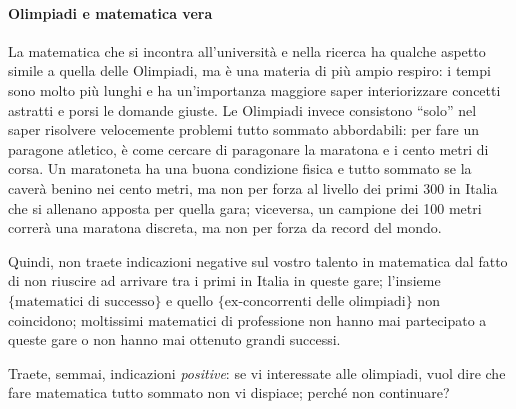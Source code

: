 \documentclass[a4paper,10pt]{paper}
\begin{document}
\paragraph{Olimpiadi e matematica vera}
 La matematica che si incontra all'università e nella ricerca ha qualche aspetto simile a quella delle Olimpiadi, ma è una materia di più ampio respiro: i tempi sono molto più lunghi e ha un'importanza maggiore saper interiorizzare concetti astratti e porsi le domande giuste. Le Olimpiadi invece consistono ``solo'' nel saper risolvere velocemente problemi tutto sommato abbordabili: per fare un paragone atletico, è come cercare di paragonare la maratona e i cento metri di corsa. Un maratoneta ha una buona condizione fisica e tutto sommato se la caverà benino nei cento metri, ma non per forza al livello dei primi 300 in Italia che si allenano apposta per quella gara; viceversa, un campione dei 100 metri correrà una maratona discreta, ma non per forza da record del mondo.
 
 Quindi, non traete indicazioni negative sul vostro talento in matematica dal fatto di non riuscire ad arrivare tra i primi in Italia in queste gare; l'insieme $\{\text{matematici di successo}\}$ e quello $\{\text{ex-concorrenti delle olimpiadi}\}$ non coincidono; moltissimi matematici di professione non hanno mai partecipato a queste gare o non hanno mai ottenuto grandi successi.
 
 Traete, semmai, indicazioni \emph{positive}: se vi interessate alle olimpiadi, vuol dire che fare matematica tutto sommato non vi dispiace; perché non continuare?
\end{document}
